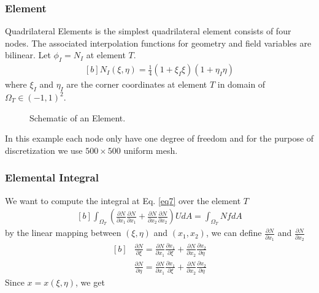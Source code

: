 \documentclass[]{article}
\begin{document}
\subsubsection{Element} \label{sec: elem}
Quadrilateral Elements is the simplest quadrilateral element consists of
four nodes. The associated interpolation functions for geometry and ﬁeld
variables are bilinear. Let $\phi_{I}=N_I $ at element $T$.
\begin{equation}\label{eq11}
	\begin{aligned}[b]
		N_{I}(\xi, \eta) = \frac{1}{4}(1+\xi_I\xi)(1+\eta_I\eta)
	\end{aligned}
\end{equation}
where $\xi_{I}$ and $\eta_{I}$ are the corner coordinates at element $T$ in domain of $\Omega_{T} \in (-1,1)^2$.

\begin{figure}[htbp]
	\centering
	
	\caption{Schematic of an Element.}
	\label{fig_el}
\end{figure}
%
In this example each node only have one degree of freedom and for the purpose of discretization we use $500 \times 500$ uniform mesh.
\subsubsection{Elemental Integral} \label{sec: elem int}
  We want to compute the integral at Eq. \ref{eq7} over the element $T$
\begin{equation}\label{eq12}
	\begin{aligned}[b]
		\int_{\Omega_{T}} (\frac{\partial N}{\partial x_{1}}
		\frac{\partial N}{\partial x_{1}}+\frac{\partial N}{\partial x_{2}} 
		\frac{\partial N}{\partial x_{2}})U dA = \int_{\Omega_{T}} Nf dA
	\end{aligned}
\end{equation}
by the linear mapping between $(\xi,\eta)$ and $(x_{1},x_2)$, we can define $\frac{\partial N}{\partial x_{1}}$ and $\frac{\partial N}{\partial x_{2}}$
\begin{equation}\label{eq13}
	\begin{aligned}[b]
&
		\frac{\partial N}{\partial \xi} = \frac{\partial N}{\partial x_{1}}\frac{\partial x_{1}}{\partial \xi}+\frac{\partial N}{\partial x_{2}}\frac{\partial x_{2}}{\partial \eta}\\
& 
		\frac{\partial N}{\partial \eta} = \frac{\partial N}{\partial x_{1}}\frac{\partial x_{1}}{\partial \xi}+\frac{\partial N}{\partial x_{2}}\frac{\partial x_{2}}{\partial \eta}
	\end{aligned}
\end{equation}
Since $x=x(\xi,\eta)$, we get
\end{document}
